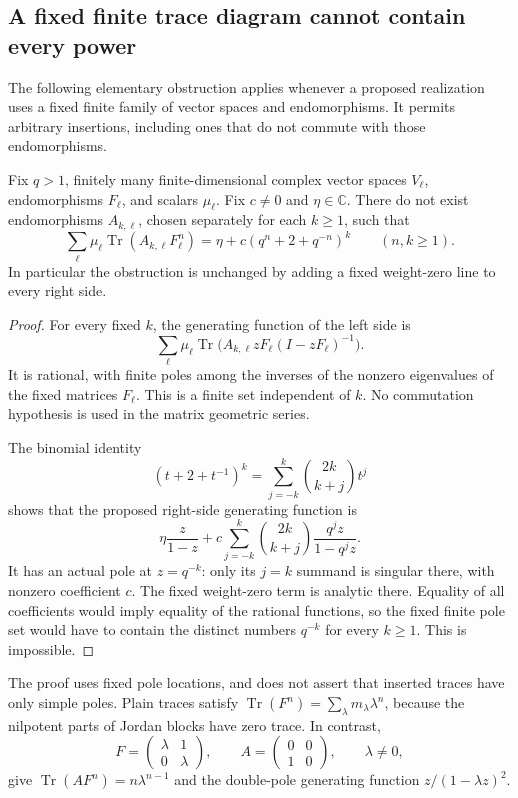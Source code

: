 \subsection{A fixed finite trace diagram cannot contain every power}\label{sec:fixed-diagram-obstruction}

The following elementary obstruction applies whenever a proposed realization uses a fixed finite family of vector spaces and endomorphisms. It permits arbitrary insertions, including ones that do not commute with those endomorphisms.

\begin{proposition}\label{prop:fixed-diagram-obstruction}
Fix $q>1$, finitely many finite-dimensional complex vector spaces $V_\ell$, endomorphisms $F_\ell$, and scalars $\mu_\ell$. Fix $c\ne0$ and $\eta\in\mathbb C$. There do not exist endomorphisms $A_{k,\ell}$, chosen separately for each $k\ge1$, such that
\[
 \sum_\ell\mu_\ell\operatorname{Tr}(A_{k,\ell}F_\ell^n)
 =\eta+c(q^n+2+q^{-n})^k
 \qquad(n,k\ge1).
\]
In particular the obstruction is unchanged by adding a fixed weight-zero line to every right side.
\end{proposition}

\begin{proof}
For every fixed $k$, the generating function of the left side is
\[
 \sum_\ell\mu_\ell\operatorname{Tr}
 \bigl(A_{k,\ell}zF_\ell(I-zF_\ell)^{-1}\bigr).
\]
It is rational, with finite poles among the inverses of the nonzero eigenvalues of the fixed matrices $F_\ell$. This is a finite set independent of $k$. No commutation hypothesis is used in the matrix geometric series.

The binomial identity
\[
 (t+2+t^{-1})^k=\sum_{j=-k}^k\binom{2k}{k+j}t^j
\]
shows that the proposed right-side generating function is
\[
 \eta\frac{z}{1-z}
 +c\sum_{j=-k}^k\binom{2k}{k+j}
       \frac{q^jz}{1-q^jz}.
\]
It has an actual pole at $z=q^{-k}$: only its $j=k$ summand is singular there, with nonzero coefficient $c$. The fixed weight-zero term is analytic there. Equality of all coefficients would imply equality of the rational functions, so the fixed finite pole set would have to contain the distinct numbers $q^{-k}$ for every $k\ge1$. This is impossible.
\end{proof}

The proof uses fixed pole locations, and does not assert that inserted traces have only simple poles. Plain traces satisfy $\operatorname{Tr}(F^n)=\sum_\lambda m_\lambda\lambda^n$, because the nilpotent parts of Jordan blocks have zero trace. In contrast,
\[
 F=\begin{pmatrix}\lambda&1\\0&\lambda\end{pmatrix},\qquad
 A=\begin{pmatrix}0&0\\1&0\end{pmatrix},\qquad\lambda\ne0,
\]
give $\operatorname{Tr}(AF^n)=n\lambda^{n-1}$ and the double-pole generating function $z/(1-\lambda z)^2$.

